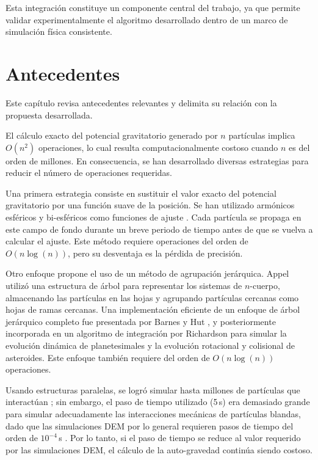 \documentclass[a4paper,11pt]{book}
\begin{document}
Esta integración constituye un componente central del trabajo, ya que permite validar experimentalmente el algoritmo desarrollado dentro de un marco de simulación física consistente.

\chapter{Antecedentes}

Este capítulo revisa antecedentes relevantes y delimita su relación con la propuesta desarrollada.

El cálculo exacto del potencial gravitatorio generado por $n$ partículas implica $O(n^2)$ operaciones, lo cual resulta computacionalmente costoso cuando $n$ es del orden de millones. En consecuencia, se han desarrollado diversas estrategias para reducir el número de operaciones requeridas.

Una primera estrategia consiste en sustituir el valor exacto del potencial gravitatorio por una función suave de la posición. Se han utilizado armónicos esféricos y bi-esféricos como funciones de ajuste \cite{6}. Cada partícula se propaga en este campo de fondo durante un breve periodo de tiempo antes de que se vuelva a calcular el ajuste. Este método requiere operaciones del orden de $O(n\log(n))$, pero su desventaja es la pérdida de precisión.

Otro enfoque propone el uso de un método de agrupación jerárquica. Appel \cite{7} utilizó una estructura de árbol para representar los sistemas de $n$-cuerpo, almacenando las partículas en las hojas y agrupando partículas cercanas como hojas de ramas cercanas. Una implementación eficiente de un enfoque de árbol jerárquico completo fue presentada por Barnes y Hut \cite{8}, y posteriormente incorporada en un algoritmo de integración por Richardson \cite{9} para simular la evolución dinámica de planetesimales y la evolución rotacional y colisional de asteroides. Este enfoque también requiere del orden de $O(n\log(n))$ operaciones.

Usando estructuras paralelas, se logró simular hasta millones de partículas que interactúan \cite{10}; sin embargo, el paso de tiempo utilizado (5\,s) era demasiado grande para simular adecuadamente las interacciones mecánicas de partículas blandas, dado que las simulaciones DEM por lo general requieren pasos de tiempo del orden de $10^{-4}$\,s \cite{11}. Por lo tanto, si el paso de tiempo se reduce al valor requerido por las simulaciones DEM, el cálculo de la auto-gravedad continúa siendo costoso.
\end{document}
